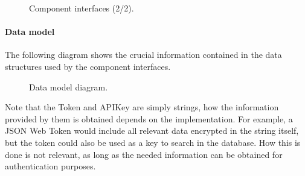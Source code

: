 \begin{figure}[H]
    \centering
    \caption{\label{fig:interfaces-2}Component interfaces (2/2).}
\end{figure}

\paragraph{Data model}
The following diagram shows the crucial information contained in the data structures used by the component interfaces. 

\begin{figure}[H]
    \centering
    \caption{\label{fig:data-model}Data model diagram.}
\end{figure}

Note that the Token and APIKey are simply strings, how the information provided by them is obtained depends on the implementation. For example, a JSON Web Token would include all relevant data encrypted in the string itself, but the token could also be used as a key to search in the database. How this is done is not relevant, as long as the needed information can be obtained for authentication purposes.


